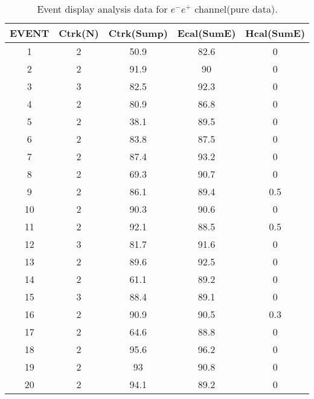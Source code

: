 \begin{table}[h!]
    \centering
    \caption{Event display analysis data for $e^-e^+$ channel(pure data).}
    \begin{tabular}{ccccc}
    \hline
    EVENT & Ctrk(N) & Ctrk(Sump) & Ecal(SumE) & Hcal(SumE) \\ \hline
    1     & 2       & 50.9       & 82.6       & 0          \\
    2     & 2       & 91.9       & 90         & 0          \\
    3     & 3       & 82.5       & 92.3       & 0          \\
    4     & 2       & 80.9       & 86.8       & 0          \\
    5     & 2       & 38.1       & 89.5       & 0          \\
    6     & 2       & 83.8       & 87.5       & 0          \\
    7     & 2       & 87.4       & 93.2       & 0          \\
    8     & 2       & 69.3       & 90.7       & 0          \\
    9     & 2       & 86.1       & 89.4       & 0.5        \\
    10    & 2       & 90.3       & 90.6       & 0          \\
    11    & 2       & 92.1       & 88.5       & 0.5        \\
    12    & 3       & 81.7       & 91.6       & 0          \\
    13    & 2       & 89.6       & 92.5       & 0          \\
    14    & 2       & 61.1       & 89.2       & 0          \\
    15    & 3       & 88.4       & 89.1       & 0          \\
    16    & 2       & 90.9       & 90.5       & 0.3        \\
    17    & 2       & 64.6       & 88.8       & 0          \\
    18    & 2       & 95.6       & 96.2       & 0          \\
    19    & 2       & 93         & 90.8       & 0          \\
    20    & 2       & 94.1       & 89.2       & 0         \\ \hline
    \end{tabular}
    \label{table:ed-ee}
    \end{table}
    
